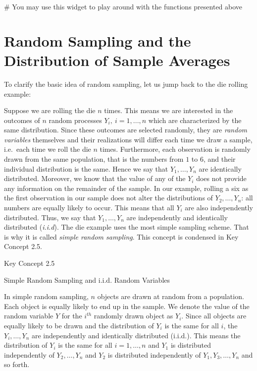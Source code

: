 \documentclass[]{book}
\theoremstyle{definition}
\theoremstyle{definition}
\theoremstyle{definition}
\theoremstyle{remark}
\begin{document}
 \# You may use this widget to play around with the functions presented
above

\section{Random Sampling and the Distribution of Sample
Averages}\label{RSATDOSA}

To clarify the basic idea of random sampling, let us jump back to the
die rolling example:

Suppose we are rolling the die \(n\) times. This means we are interested
in the outcomes of \(n\) random processes \(Y_i, \ i=1,...,n\) which are
characterized by the same distribution. Since these outcomes are
selected randomly, they are \emph{random variables} themselves and their
realizations will differ each time we draw a sample, i.e.~each time we
roll the die \(n\) times. Furthermore, each observation is randomly
drawn from the same population, that is the numbers from \(1\) to \(6\),
and their individual distribution is the same. Hence we say that
\(Y_1,\dots,Y_n\) are identically distributed. Moreover, we know that
the value of any of the \(Y_i\) does not provide any information on the
remainder of the sample. In our example, rolling a six as the first
observation in our sample does not alter the distributions of
\(Y_2,\dots,Y_n\): all numbers are equally likely to occur. This means
that all \(Y_i\) are also independently distributed. Thus, we say that
\(Y_1,\dots,Y_n\) are independently and identically distributed
(\emph{i.i.d}). The die example uses the most simple sampling scheme.
That is why it is called \emph{simple random sampling}. This concept is
condensed in Key Concept 2.5.

Key Concept 2.5

Simple Random Sampling and i.i.d. Random Variables

In simple random sampling, \(n\) objects are drawn at random from a
population. Each object is equally likely to end up in the sample. We
denote the value of the random variable \(Y\) for the \(i^{th}\)
randomly drawn object as \(Y_i\). Since all objects are equally likely
to be drawn and the distribution of \(Y_i\) is the same for all \(i\),
the \(Y_i, \dots, Y_n\) are independently and identically distributed
(i.i.d.). This means the distribution of \(Y_i\) is the same for all
\(i=1,\dots,n\) and \(Y_1\) is distributed independently of
\(Y_2, \dots, Y_n\) and \(Y_2\) is distributed independently of
\(Y_1, Y_3, \dots, Y_n\) and so forth.
\end{document}
